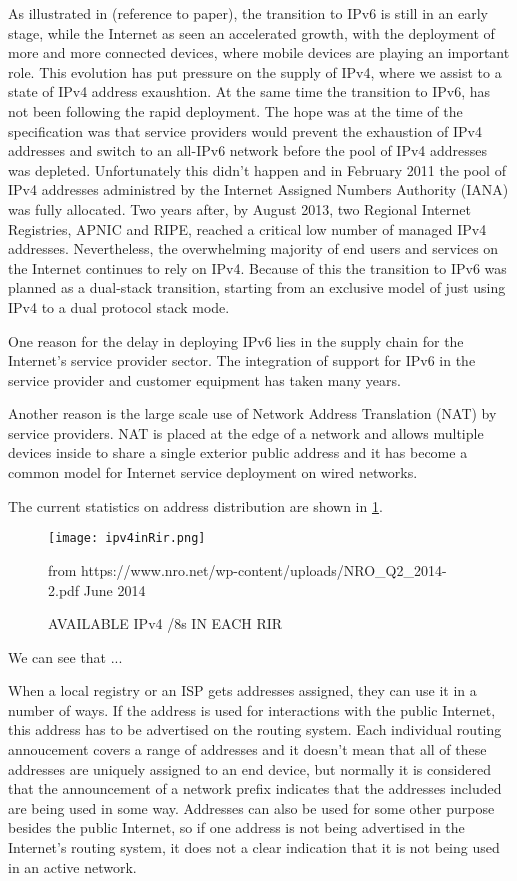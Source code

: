 \documentclass[11pt,a4paper]{scrreprt}
\begin{document}
As illustrated in (reference to paper), the transition to IPv6 is still in an early stage, while the Internet as seen an accelerated growth, with the deployment of more and more connected devices, where mobile devices are playing an important role. This evolution has put pressure on the supply of IPv4, where we assist to a state of IPv4 address exaushtion. At the same time the transition to IPv6, has not been following the rapid deployment. The hope was at the time of the specification was that service providers would prevent the exhaustion of IPv4 addresses and switch to an all-IPv6 network before the pool of IPv4 addresses was depleted. Unfortunately this didn't happen and in February 2011 the pool of IPv4 addresses administred by the Internet Assigned Numbers Authority (IANA) was fully allocated. Two years after, by August 2013, two Regional Internet Registries, APNIC and RIPE, reached a critical low number of managed IPv4 addresses. Nevertheless, the overwhelming majority of end users and services on the Internet continues to rely on IPv4. Because of this the transition to IPv6 was planned as a dual-stack transition, starting from an exclusive model of just using IPv4 to a dual protocol stack mode.

One reason for the delay in deploying IPv6 lies in the supply chain for the Internet's service provider sector. The integration of support for IPv6 in the service provider and customer equipment has taken many years.  

Another reason is the large scale use of Network Address Translation (NAT) by service providers. NAT is placed at the edge of a network and allows multiple devices inside to share a single exterior public address and it has become a common model for Internet service deployment on wired networks. 

The current statistics on address distribution are shown in \ref{fig:rirs_available_ipv4}.

\begin{figure}[h!]
\centering
\texttt{[image: ipv4inRir.png]}
\caption{AVAILABLE IPv4 /8s IN EACH RIR}
from https://www.nro.net/wp-content/uploads/NRO\_Q2\_2014-2.pdf June 2014
\label{fig:rirs_available_ipv4}
\end{figure}

We can see that ...

When a local registry or an ISP gets addresses assigned, they can use it in a number of ways. If the address is used for interactions with the public Internet, this address has to be advertised on the routing system. Each individual routing annoucement covers a range of addresses and it doesn't mean that all of these addresses are uniquely assigned to an end device, but normally it is considered that the announcement of a network prefix indicates that the addresses included are being used in some way. Addresses can also be used for some other purpose besides the public Internet, so if one address is not being advertised in the Internet's routing system, it does not a clear indication that it is not being used in an active network.
\end{document}
